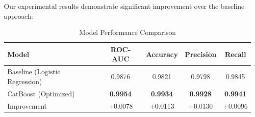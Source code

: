 \documentclass[11pt,a4paper]{article}
\begin{document}
Our experimental results demonstrate significant improvement over the baseline approach:

\begin{table}[H]
\centering
\caption{Model Performance Comparison}
\begin{tabular}{@{}lcccc@{}}
\toprule
\textbf{Model} & \textbf{ROC-AUC} & \textbf{Accuracy} & \textbf{Precision} & \textbf{Recall} \\
\midrule
Baseline (Logistic Regression) & 0.9876 & 0.9821 & 0.9798 & 0.9845 \\
CatBoost (Optimized) & \textbf{0.9954} & \textbf{0.9934} & \textbf{0.9928} & \textbf{0.9941} \\
\midrule
Improvement & +0.0078 & +0.0113 & +0.0130 & +0.0096 \\
\bottomrule
\end{tabular}
\end{table}
\end{document}
